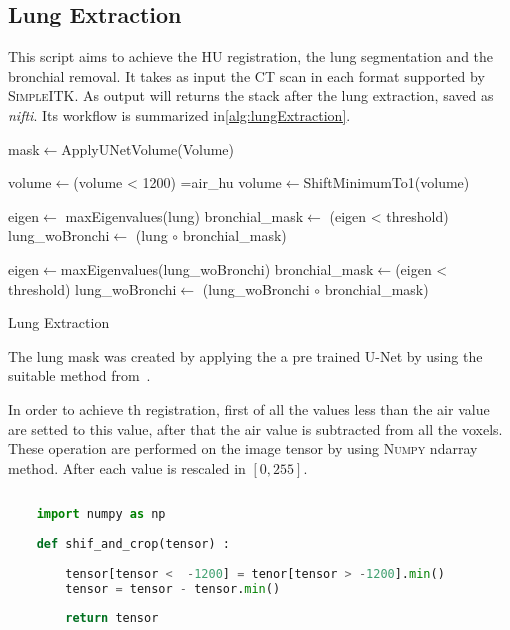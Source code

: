 \documentclass{standalone}
\begin{document}
	\subsection{Lung Extraction}
	
	This script aims to achieve the HU registration, the lung segmentation and the bronchial removal. It takes as input the CT scan in each format supported by \textsc{SimpleITK}.  As output will returns the stack after the lung extraction, saved as \textit{nifti}.  Its workflow is summarized in\ref{alg:lungExtraction}.
	
		 
	\begin{algorithm}
		
		\SetAlgoLined
		\DontPrintSemicolon
	
		\;
		
		mask$\leftarrow$ApplyUNetVolume(Volume)\;
		
		volume$\leftarrow$(volume < 1200) =air\_hu\;
		volume$\leftarrow$ShiftMinimumTo1(volume)\;
		
		\;
		
		eigen$\leftarrow$ maxEigenvalues(lung)\;
		bronchial\_mask$\leftarrow$ (eigen < threshold)\;
		lung\_woBronchi$\leftarrow$ (lung $\circ$ bronchial\_mask)\;
		
		\;
		
		eigen$\leftarrow$maxEigenvalues(lung\_woBronchi)\;
		bronchial\_mask$\leftarrow$(eigen < threshold)\;
		lung\_woBronchi$\leftarrow$ (lung\_woBronchi $\circ$ bronchial\_mask)\;
	
		\caption{Lung Extraction}\label{alg:lungExtraction}
		
	\end{algorithm}
	
	
	The lung mask was created by applying the a pre trained U-Net by using the suitable method from~\cite{REP:lungmask}. 

	In order to achieve th registration, first of all the values less than the air value are setted to this value, after that the air value is subtracted from all the voxels. These operation are performed on the image tensor by using \textsc{Numpy} ndarray method. After each value is rescaled in $[0, 255]$. 
	
	\lstset{style=python}
	\begin{lstlisting}[language=python, caption=HU registering function, label=code:saf]
		
	import numpy as np
		
	def shif_and_crop(tensor) :
		
		tensor[tensor <  -1200] = tenor[tensor > -1200].min()
		tensor = tensor - tensor.min()
	
		return tensor
	\end{lstlisting}
\end{document}
